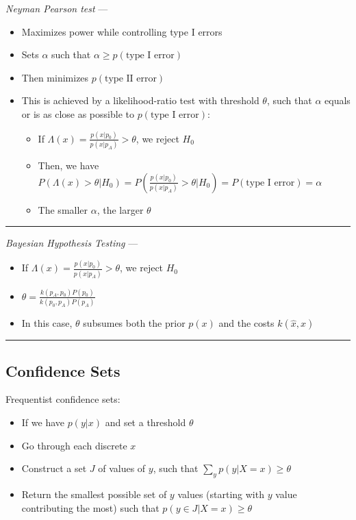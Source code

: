 \emph{Neyman Pearson test} ---
\begin{itemize}
    \item Maximizes power while controlling type I errors
    \item Sets $\alpha$ such that $\alpha \geq p(\textrm{type I error})$

    \item Then minimizes $p(\textrm{type II error})$
    \item This is achieved by a likelihood-ratio test with threshold $\theta$, such that $\alpha$ equals or is as close as possible to $ p(\textrm{type I error})$: 
    \begin{itemize}
        \item If $\Lambda(x) = \frac{p(x|p_0)}{p(x|p_A)} > \theta$, we reject $H_0$
        \item Then, we have $P(\Lambda(x) > \theta | H_0) = P(\frac{p(x|p_0)}{p(x|p_A)} > \theta | H_0 ) = P(\textrm{type I error}) = \alpha$
        \item The smaller $\alpha$, the larger $\theta$
    \end{itemize}
\end{itemize}

{\color{lightgray}\hrule height 0.001mm}

\emph{Bayesian Hypothesis Testing} ---
\begin{itemize}
    \item If $\Lambda(x) = \frac{p(x|p_0)}{p(x|p_A)} > \theta$, we reject $H_0$
    \item $\theta = \frac{k(p_A,p_0)P(p_0)}{k(p_0,p_A)P(p_A)}$
    \item In this case, $\theta$ subsumes both the prior $p(x)$ and the costs $k(\hat{x},x)$
\end{itemize}

{\color{black}\hrule height 0.001mm}

\subsection*{Confidence Sets}
Frequentist confidence sets:
\begin{itemize}
    \item If we have $p(y|x)$ and set a threshold $\theta$
    \item Go through each discrete $x$
    \item Construct a set $J$ of values of $y$, such that $\sum_y p(y | X = x) \geq \theta$
    \item Return the smallest possible set of $y$ values (starting with $y$ value contributing the most) such that $p(y \in J | X = x) \geq \theta$
\end{itemize}